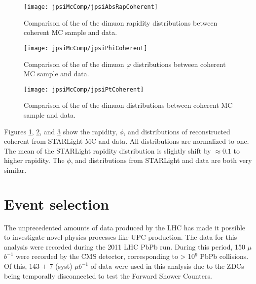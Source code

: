       \begin{figure}[!Hhbt]
        \centering
        \texttt{[image: jpsiMcComp/jpsiAbsRapCoherent]}
        \caption{Comparison of the of the dimuon rapidity distributions between 
          coherent \JPsi{} MC sample and data.}
        \label{fig:jpsiAbsRapCoherent}
      \end{figure}
      \begin{figure}[!Hhbt]
        \centering
        \texttt{[image: jpsiMcComp/jpsiPhiCoherent]}
        \caption{Comparison of the of the dimuon $\varphi$ distributions 
          between coherent \JPsi{} MC sample and data.}
        \label{fig:jpsiPhiCoherent}
      \end{figure}
      \begin{figure}[!Hhbt]
        \centering
        \texttt{[image: jpsiMcComp/jpsiPtCoherent]}
        \caption{Comparison of the of the dimuon \pt{} distributions 
          between coherent \JPsi{} MC sample and data.}
        \label{fig:jpsiPtCoherent}
      \end{figure}
    Figures \ref{fig:jpsiAbsRapCoherent}, \ref{fig:jpsiPhiCoherent}, and
      \ref{fig:jpsiPtCoherent} show  the rapidity, $\phi$, and  \pt{} 
      distributions of reconstructed coherent \JPsi{} from STARLight MC and 
      data. 
    All distributions are normalized to one. 
    The mean of the STARLight rapidity distribution is slightly shift by 
      $\approx 0.1$ to higher rapidity. 
    The $\phi$, and  \pt{} distributions from STARLight and data are both
      very similar. 

  \section{\label{sec:DataSetEvSel} Event selection}
    The unprecedented amounts of data produced by the LHC has made it possible 
      to investigate novel physics processes like UPC \JPsi{} production.
    The data for this analysis were recorded during the 2011 LHC PbPb run. 
    During this period, 150 $\mu$$b^{-1}$ were recorded by the CMS detector,
      corresponding to > 10$^{9}$ PbPb collisions. 
    Of this, 143 $\pm$ 7 (syst) $\mu$$b^{-1}$ of data were used in this analysis due to the 
      ZDCs being temporally disconnected to test the Forward Shower Counters.

